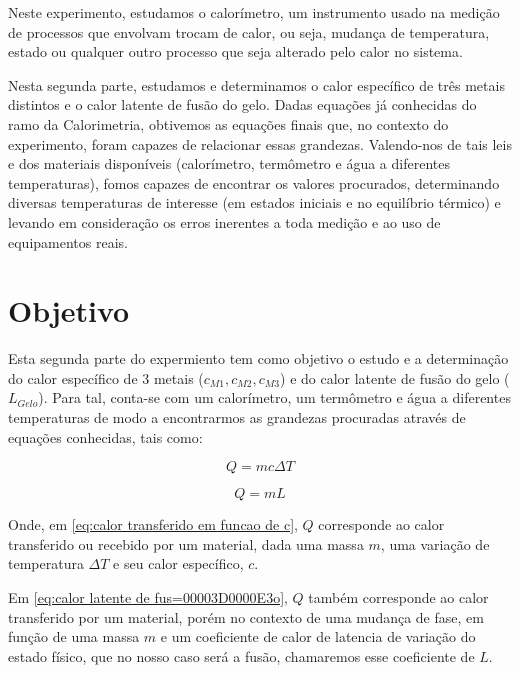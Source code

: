 \documentclass[a4paper]{article}
\begin{document}
	Neste experimento, estudamos o calorímetro, um instrumento usado na
	medição de processos que envolvam trocam de calor, ou seja, mudança
	de temperatura, estado ou qualquer outro processo que seja alterado
	pelo calor no sistema.

	Nesta segunda parte, estudamos e determinamos o calor específico de
	três metais distintos e o calor latente de fusão do gelo. Dadas equações
	já conhecidas do ramo da Calorimetria, obtivemos as equações finais
	que, no contexto do experimento, foram capazes de relacionar essas
	grandezas. Valendo-nos de tais leis e dos materiais disponíveis (calorímetro,
	termômetro e água a diferentes temperaturas), fomos capazes de encontrar
	os valores procurados, determinando diversas temperaturas de interesse
	(em estados iniciais e no equilíbrio térmico) e levando em consideração
	os erros inerentes a toda medição e ao uso de equipamentos reais.


	\section{Objetivo}

	Esta segunda parte do expermiento tem como objetivo o estudo e a determinação
	do calor específico de 3 metais ($c_{M1},c_{M2},c_{M3}$) e do calor
	latente de fusão do gelo ($L_{Gelo}$). Para tal, conta-se com um
	calorímetro, um termômetro e água a diferentes temperaturas de modo
	a encontrarmos as grandezas procuradas através de equações conhecidas,
	tais como:

	\begin{equation}
	Q=mc\Delta T\label{eq:calor transferido em funcao de c}
	\end{equation}


	\begin{equation}
	Q=mL\label{eq:calor latente de fus=00003D0000E3o}
	\end{equation}


	Onde, em \eqref{eq:calor transferido em funcao de c}, $Q$ corresponde
	ao calor transferido ou recebido por um material, dada uma massa $m$,
	uma variação de temperatura $\Delta T$ e seu calor específico, $c$.

	Em \eqref{eq:calor latente de fus=00003D0000E3o}, $Q$ também corresponde
	ao calor transferido por um material, porém no contexto de uma mudança
	de fase, em função de uma massa $m$ e um coeficiente de calor de
	latencia de variação do estado físico, que no nosso caso será a fusão,
	chamaremos esse coeficiente de $L$.
\end{document}
